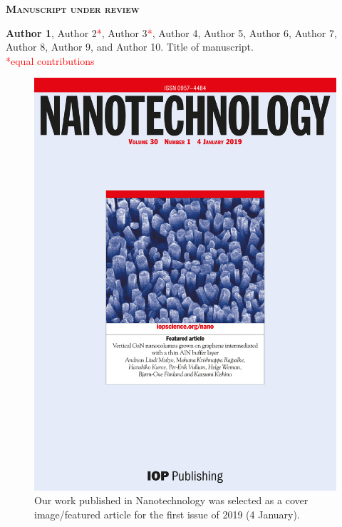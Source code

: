 {\color{sophia} \small \bfseries {} \selectfont \scshape \noindent Manuscript under review}

\begin{enumerate}[wide=0em, leftmargin=*, labelsep=0.5em, widest=99, label={[\arabic*]}]

    \item \textbf{Author 1}, Author 2\textcolor{red}{*}, Author 3\textcolor{red}{*}, Author 4, Author 5, Author 6, Author 7, Author 8, Author 9, and Author 10. \textcolor{ntnu}{Title of manuscript}. \\
    \textcolor{red}{*equal contributions}

\end{enumerate}

\begin{figure}
    \centering
    \includegraphics[width=\textwidth]{figures/EN6xzaWWAAEHOBt.jpg}
    \caption[Cover image/featured article in Nanotechnology]{Our work published in Nanotechnology was selected as a cover image/featured article for the first issue of 2019 (4 January).}
    \label{fig:coverimage}
\end{figure}
 

